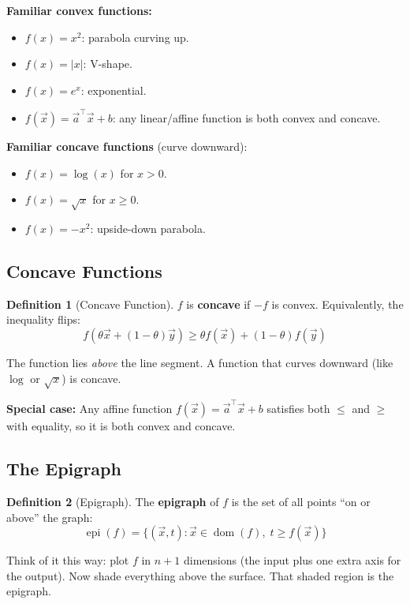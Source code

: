 \documentclass[10pt]{article}
\theoremstyle{definition}
\newtheorem{definition}{Definition}
\theoremstyle{plain}
\DeclareMathOperator{\dom}{dom}
\DeclareMathOperator{\epi}{epi}
\begin{document}
\begin{result}
\textbf{Familiar convex functions:}
\begin{itemize}
    \item $f(x) = x^2$: parabola curving up.
    \item $f(x) = |x|$: V-shape.
    \item $f(x) = e^x$: exponential.
    \item $f(\vec{x}) = \vec{a}^\top \vec{x} + b$: any linear/affine function is both convex and concave.
\end{itemize}
\textbf{Familiar concave functions} (curve downward):
\begin{itemize}
    \item $f(x) = \log(x)$ for $x > 0$.
    \item $f(x) = \sqrt{x}$ for $x \ge 0$.
    \item $f(x) = -x^2$: upside-down parabola.
\end{itemize}
\end{result}

\subsection{Concave Functions}

\begin{definition}[Concave Function]
$f$ is \textbf{concave} if $-f$ is convex. Equivalently, the inequality flips:
\[
    f(\theta \vec{x} + (1-\theta)\vec{y}) \ge \theta f(\vec{x}) + (1-\theta)f(\vec{y})
\]
\end{definition}

The function lies \emph{above} the line segment. A function that curves downward (like $\log$ or $\sqrt{x}$) is concave.

\textbf{Special case:} Any affine function $f(\vec{x}) = \vec{a}^\top \vec{x} + b$ satisfies both $\le$ and $\ge$ with equality, so it is both convex and concave.

\subsection{The Epigraph}

\begin{definition}[Epigraph]
The \textbf{epigraph} of $f$ is the set of all points ``on or above'' the graph:
\[
    \epi(f) = \{(\vec{x}, t) : \vec{x} \in \dom(f), \; t \ge f(\vec{x})\}
\]
\end{definition}

Think of it this way: plot $f$ in $n+1$ dimensions (the input plus one extra axis for the output). Now shade everything above the surface. That shaded region is the epigraph.
\end{document}
